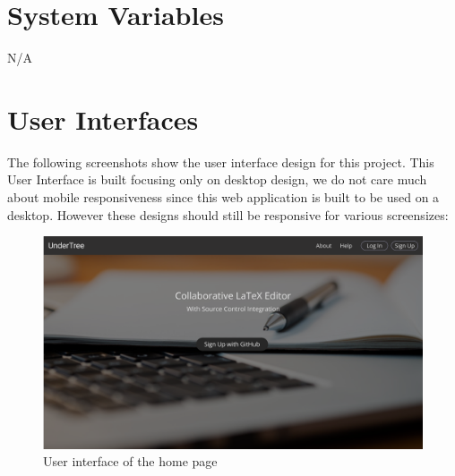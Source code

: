 \documentclass[12pt, titlepage]{article}
\begin{document}
	
	
	
	
	
	\section{System Variables}
	
	N/A
	
	\section{User Interfaces}
	
	The following screenshots show the user interface design for this project. This User Interface is built focusing only on desktop design, we do not care much about mobile responsiveness since this web application is built to be used on a desktop. However these designs should still be responsive for various screensizes:
	
	\begin{figure}[H]
		\centering
		\includegraphics[width=\linewidth]{homePage.png}
		\caption{User interface of the home page}
	\end{figure}
	
\end{document}
